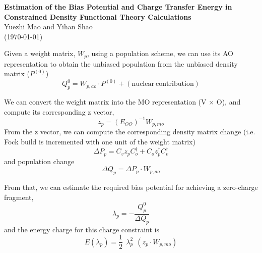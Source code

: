 \documentclass[aip,jcp,preprint,superscriptaddress,amsmath,amssymb]{revtex4-1}
\begin{document}
\begin{center} 
\textbf{Estimation of the Bias Potential and Charge Transfer Energy in Constrained Density Functional Theory Calculations}  \\
Yuezhi Mao and Yihan Shao \\
(\today)  \\
\end{center} 



Given a weight matrix, $W_{p}$, using a population scheme, 
we can use its AO representation to obtain the unbiased population 
from the unbiased density matrix ($P^{(0)}$) 
\begin{equation}
Q_p^{0} = W_{p,ao} \cdot P^{(0)} + \mathrm{(nuclear~contribution)} 
\end{equation} 

We can convert the weight matrix into the MO representation (V $\times$ O),    
and compute its corresponding z vector, 
\begin{equation}
z_p = \left( E_{\Theta \Theta} \right)  ^{-1}  W_{p,mo} 
\end{equation}
From the z vector, we can compute the corresponding density matrix change (i.e. Fock build is incremented with one unit of the weight matrix)
\begin{equation}
\Delta P_p  = C_v z_p C_o^\dagger + C_o z_p^\dagger C_v^\dagger 
\end{equation}
and population change
\begin{equation}
\Delta Q_p = \Delta P_p \cdot W_{p,ao}  
\end{equation} 

From that, we can estimate the required bias potential for achieving a zero-charge fragment, 
\begin{equation}
\lambda_p = -  \frac{ Q_p^{0}  }  {\Delta Q_p  }
\end{equation} 
and the energy charge for this charge constraint is 
\begin{equation}
E ( \lambda_p ) = \frac{1}{2}~~ \lambda_p^2  ~~ (z_p \cdot W_{p,mo} ) 
\end{equation} 







\end{document}
